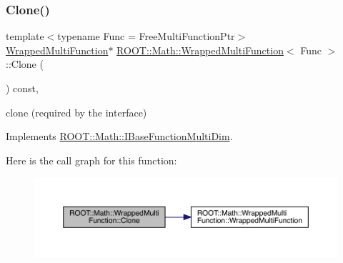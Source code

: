 \subsubsection{\texorpdfstring{Clone()}{Clone()}\hspace{0.1cm}{\footnotesize\ttfamily [1/2]}}
{\footnotesize\ttfamily template$<$typename Func  = Free\+Multi\+Function\+Ptr$>$ \\
\mbox{\hyperlink{classROOT_1_1Math_1_1WrappedMultiFunction}{Wrapped\+Multi\+Function}}$\ast$ \mbox{\hyperlink{classROOT_1_1Math_1_1WrappedMultiFunction}{R\+O\+O\+T\+::\+Math\+::\+Wrapped\+Multi\+Function}}$<$ Func $>$\+::Clone (\begin{DoxyParamCaption}{ }\end{DoxyParamCaption}) const\hspace{0.3cm}{\ttfamily [inline]}, {\ttfamily [virtual]}}



clone (required by the interface) 



Implements \mbox{\hyperlink{classROOT_1_1Math_1_1IBaseFunctionMultiDim_a57939204b1f525b43835b42e0635dd3b}{R\+O\+O\+T\+::\+Math\+::\+I\+Base\+Function\+Multi\+Dim}}.

Here is the call graph for this function\+:
\nopagebreak
\begin{figure}[H]
\begin{center}
\leavevmode
\includegraphics[width=350pt]{de/da4/classROOT_1_1Math_1_1WrappedMultiFunction_aafa24e359a607b4278f1bf238bdbc336_cgraph}
\end{center}
\end{figure}
\mbox{\label{classROOT_1_1Math_1_1WrappedMultiFunction_aafa24e359a607b4278f1bf238bdbc336}} 
